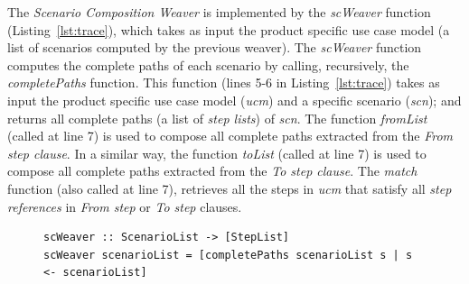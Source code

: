 \documentclass{report}
\begin{document}
\begin{frontmatter}
{%


The \emph{Scenario Composition Weaver} is implemented by the \emph{scWeaver} function (Listing~\ref{lst:trace}), which takes 
as input the product specific use case model (a list of scenarios computed by the previous weaver).  
The \emph{scWeaver} function computes the complete paths of each  
scenario by calling, recursively, the \emph{completePaths} function. This 
function (lines 5-6 in Listing~\ref{lst:trace}) 
takes as input the product specific use case model (\emph{ucm}) and a specific
scenario (\emph{scn});
and returns all complete paths (a list of \emph{step lists}) of
\emph{scn}. The function \emph{fromList} (called at line 7) is used to
compose all complete paths extracted from the \emph{From step
clause}. In a similar way, the function \emph{toList} (called at
line 7) is used to compose all complete paths extracted from the
\emph{To step clause}. The \emph{match} function (also called at
line 7), retrieves all the steps in \emph{ucm} that satisfy all 
\emph{step references} in \emph{From step} or \emph{To step}
clauses. 


\begin{figure}
\begin{lstlisting}[belowskip=10pt,frame=tb,caption={Scenario composition weaver function},label=lst:trace]
scWeaver :: ScenarioList -> [StepList]
scWeaver scenarioList = [completePaths scenarioList s | s <- scenarioList]
 

\end{lstlisting}
\end{figure}}
\end{frontmatter}
\end{document}
